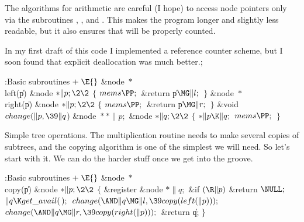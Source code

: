 The algorithms for arithmetic are careful (I hope) to access node
pointers only via the subroutines , , and . This
makes the program longer and slightly less readable, but it also
ensures that  will be properly counted.

In my first draft of this code I implemented a reference counter scheme,
but I soon found that explicit deallocation was much better.;

\Y\B\4:Basic subroutines\X${}\mathrel+\E{}$\6
\&{node} ${}{*}{}$\\{left}(\|p)\1\1\6
\&{node} ${}{*}\|p;\2\2{}$\6
${}\{{}$\1\6
${}\\{mems}\PP;{}$\6
\&{return} \|p${}\MG\|l;{}$\6
\4${}\}{}$\2\7
\&{node} ${}{*}{}$\\{right}(\|p)\1\1\6
\&{node} ${}{*}\|p;\2\2{}$\6
${}\{{}$\1\6
${}\\{mems}\PP;{}$\6
\&{return} \|p${}\MG\|r;{}$\6
\4${}\}{}$\2\7
\&{void} ${}\\{change}(\|p,\39\|q{}$)\1\1\6
\&{node} ${}{*}{*}\|p;{}$\6
\&{node} ${}{*}\|q;\2\2{}$\6
${}\{{}$\1\6
${}{*}\|p\K\|q;{}$\6
${}\\{mems}\PP;{}$\6
\4${}\}{}$\2\par
\fi

Simple tree operations. The multiplication routine needs to make
several
copies of subtrees, and the copying algorithm is one of the simplest we
will need. So let's start with it. We can do the harder stuff once we
get into the groove.

\Y\B\4:Basic subroutines\X${}\mathrel+\E{}$\6
\&{node} ${}{*}{}$\\{copy}(\|p)\1\1\6
\&{node} ${}{*}\|p;\2\2{}$\6
${}\{{}$\1\6
\&{register} \&{node} ${}{*}\|q;{}$\7
\&{if} ${}(\R\|p){}$\1\5
\&{return} ${}\NULL;{}$\2\6
${}\|q\K\\{get\_avail}(\,);{}$\6
${}\\{change}({\AND}\|q\MG\|l,\39\\{copy}(\\{left}(\|p)));{}$\6
${}\\{change}({\AND}\|q\MG\|r,\39\\{copy}(\\{right}(\|p)));{}$\6
\&{return} \|q;\6
\4${}\}{}$\2\par
\fi

